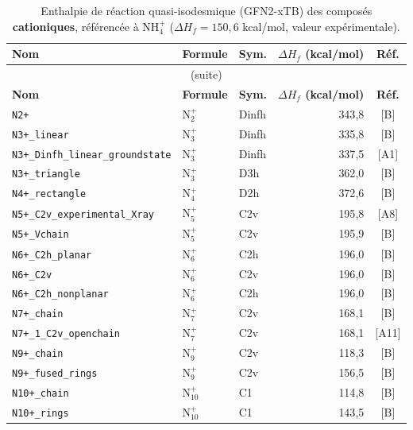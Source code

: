 \begin{longtable}{@{}p{4.6cm}lp{1.4cm}rc@{}}
\caption{Enthalpie de r\'eaction quasi-isodesmique (GFN2-xTB) des compos\'es \textbf{cationiques}, r\'ef\'erenc\'ee \`a NH$_4^+$ ($\Delta H_f=150{,}6$ kcal/mol, valeur exp\'erimentale).}
\label{tab:isodesmic-cation}\\
\toprule
\textbf{Nom} & \textbf{Formule} & \textbf{Sym.} & \textbf{$\Delta H_f$ (kcal/mol)} & \textbf{R\'ef.} \\
\midrule
\endfirsthead
\multicolumn{5}{c}{\small (suite)}\\
\toprule
\textbf{Nom} & \textbf{Formule} & \textbf{Sym.} & \textbf{$\Delta H_f$ (kcal/mol)} & \textbf{R\'ef.} \\
\midrule
\endhead
\bottomrule
\endfoot
\bottomrule
\endlastfoot
\addlinespace
\texttt{N2+} & N$_{2}^{+}$ & Dinfh & 343{,}8 & [B] \\
\addlinespace
\texttt{N3+\_linear} & N$_{3}^{+}$ & Dinfh & 335{,}8 & [B] \\
\texttt{N3+\_Dinfh\_linear\_groundstate} & N$_{3}^{+}$ & Dinfh & 337{,}5 & [A1] \\
\texttt{N3+\_triangle} & N$_{3}^{+}$ & D3h & 362{,}0 & [B] \\
\addlinespace
\texttt{N4+\_rectangle} & N$_{4}^{+}$ & D2h & 372{,}6 & [B] \\
\addlinespace
\texttt{N5+\_C2v\_experimental\_Xray} & N$_{5}^{+}$ & C2v & 195{,}8 & [A8] \\
\texttt{N5+\_Vchain} & N$_{5}^{+}$ & C2v & 195{,}9 & [B] \\
\addlinespace
\texttt{N6+\_C2h\_planar} & N$_{6}^{+}$ & C2h & 196{,}0 & [B] \\
\texttt{N6+\_C2v} & N$_{6}^{+}$ & C2v & 196{,}0 & [B] \\
\texttt{N6+\_C2h\_nonplanar} & N$_{6}^{+}$ & C2h & 196{,}0 & [B] \\
\addlinespace
\texttt{N7+\_chain} & N$_{7}^{+}$ & C2v & 168{,}1 & [B] \\
\texttt{N7+\_1\_C2v\_openchain} & N$_{7}^{+}$ & C2v & 168{,}1 & [A11] \\
\addlinespace
\texttt{N9+\_chain} & N$_{9}^{+}$ & C2v & 118{,}3 & [B] \\
\texttt{N9+\_fused\_rings} & N$_{9}^{+}$ & C2v & 156{,}5 & [B] \\
\addlinespace
\texttt{N10+\_chain} & N$_{10}^{+}$ & C1 & 114{,}8 & [B] \\
\texttt{N10+\_rings} & N$_{10}^{+}$ & C1 & 143{,}5 & [B] \\
\end{longtable}
